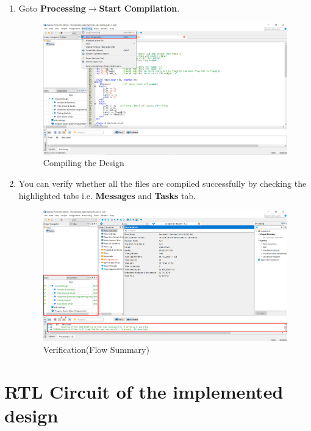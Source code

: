 \documentclass[12pt,singleside,a4paper]{article}
\begin{document}
\begin{enumerate}
    \item Goto \textbf{Processing}$\rightarrow$\textbf{Start Compilation}.
    \begin{figure}[H]
        \centering
    \includegraphics[width=14cm,keepaspectratio]{startcompialu.png}
    \caption{Compiling the Design}
    \end{figure}
    \newpage
    \item You can verify whether all the files are compiled successfully by checking the highlighted tabs i.e. \textbf{Messages} and \textbf{Tasks} tab.
    \begin{figure}[H]
        \centering
    \includegraphics[width=14cm,keepaspectratio]{compilation done.png}
    \caption{Verification(Flow Summary)}
    \end{figure}
    
\end{enumerate}
\newpage
\section{RTL Circuit of the implemented design}
\end{document}
